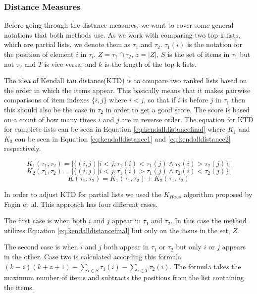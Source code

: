 \subsubsection{Distance Measures}\label{sec:distance}
Before going through the distance measures, we want to cover some general notations that both methods use. As we work with comparing two top-k lists, which are partial lists, we denote them as $\tau_1$ and $\tau_2$. $\tau_1 (i)$ is the notation for the position of element $i$ in $\tau_i$. $Z = \tau_1 \cap \tau_2$, $z=|Z|$, $S$ is the set of items in $\tau_1$ but not $\tau_2$ and $T$ is vice versa, and $k$ is the length of the top-k lists.

The idea of Kendall tau distance(KTD) is to compare two ranked lists based on the order in which the items appear. This basically means that it makes pairwise comparisons of item indexes $\{i,j\}$ where $i < j$, so that if $i$ is before $j$ in $\tau_1$ then this should also be the case in $\tau_2$ in order to get a good score. The score is based on a count of how many times $i$ and $j$ are in reverse order. The equation for KTD for complete lists can be seen in Equation \ref{eq:kendalldistancefinal} where $K_1$ and $K_2$ can be seen in Equation \ref{eq:kendalldistance1} and \ref{eq:kendalldistance2} respectively.

\begin{equation}\label{eq:kendalldistance1}
K_1(\tau_1,\tau_2) = | \{(i,j) | i < j, \tau_1 (i) < \tau_1 (j) \land \tau_2 (i) > \tau_2 (j)\}|
\end{equation}
\begin{equation}\label{eq:kendalldistance2}
K_2(\tau_1,\tau_2) = | \{(i,j) | i < j, \tau_1 (i) > \tau_1 (j) \land \tau_2 (i) < \tau_2 (j) \} |
\end{equation}
\begin{equation}\label{eq:kendalldistancefinal}
K(\tau_1,\tau_2) = K_1(\tau_1,\tau_2) + K_2(\tau_1,\tau_2)
\end{equation}

In order to adjust KTD for partial lists we used the $K_{Haus}$ algorithm proposed by Fagin et al\cite{comparing:topk}. This approach has four different cases.

The first case is when both $i$ and $j$ appear in $\tau_1$ and $\tau_2$. In this case the method utilizes Equation \ref{eq:kendalldistancefinal} but only on the items in the set, $Z$.

The second case is when $i$ and $j$ both appear in $\tau_1$ or $\tau_2$ but only $i$ or $j$ appears in the other. Case two is calculated according this formula $(k-z)(k+z+1)- \sum_{i \in S} \tau_1(i)- \sum_{i \in T} \tau_2(i)$. The formula takes the maximum number of items and subtracts the positions from the list containing the items.

